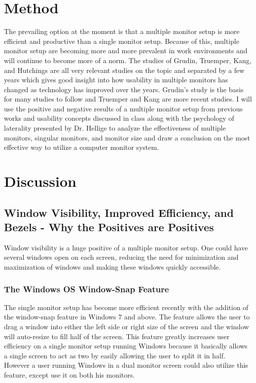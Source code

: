 \documentclass[a4paper]{article}
\begin{document}
\section{Method}
The prevailing option at the moment is that a multiple monitor setup is more efficient and productive than a single monitor setup. Because of this, multiple monitor setup are becoming more and more prevalent in work environments and will continue to become more of a norm. The studies of Grudin, Truemper, Kang, and Hutchings are all very relevant studies on the topic and separated by a few years which gives good insight into how usability in multiple monitors has changed as technology has improved over the years. Grudin's study is the basis for many studies to follow and Truemper and Kang are more recent studies. I will use the positive and negative results of a multiple monitor setup from previous works and usability concepts discussed in class along with the psychology of laterality presented by Dr. Hellige to analyze the effectiveness of multiple monitors, singular monitors, and monitor size and draw a conclusion on the most effective way to utilize a computer monitor system.

\section{Discussion}
\subsection{Window Visibility, Improved Efficiency, and Bezels - Why the Positives are Positives}
Window visibility is a huge positive of a multiple monitor setup. One could have several windows open on each screen, reducing the need for minimization and maximization of windows and making these windows quickly accessible. 
\subsubsection{The Windows OS Window-Snap Feature}
The single monitor setup has become more efficient recently with the addition of the window-snap feature in Windows 7 and above. The feature allows the user to drag a window into either the left side or right size of the screen and the window will auto-resize to fill half of the screen. This feature greatly increases user efficiency on a single monitor setup running Windows because it basically allows a single screen to act as two by easily allowing the user to split it in half. However a user running Windows in a dual monitor screen could also utilize this feature, except use it on both his monitors.
\end{document}
